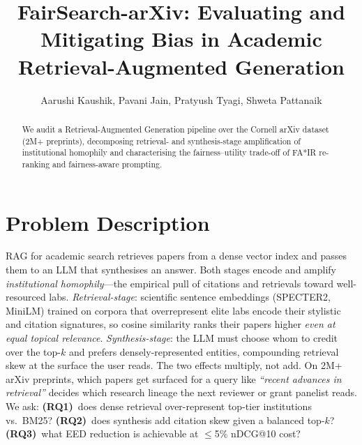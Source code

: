 \documentclass[sigconf]{acmart}
\begin{document}
\title[FairSearch-arXiv]{FairSearch-arXiv: Evaluating and Mitigating Bias in Academic Retrieval-Augmented Generation}

\author{Aarushi Kaushik, Pavani Jain, Pratyush Tyagi, Shweta Pattanaik}

\renewcommand{\shortauthors}{Kaushik, Jain, Tyagi, Pattanaik}

\begin{abstract}
We audit a Retrieval-Augmented Generation pipeline over the Cornell arXiv dataset (2M+ preprints), decomposing retrieval- and synthesis-stage amplification of institutional homophily and characterising the fairness--utility trade-off of FA*IR re-ranking and fairness-aware prompting.
\end{abstract}

\maketitle

\linenumbers

\thispagestyle{customfooter}
\pagestyle{customfooter}

\section{Problem Description}
RAG for academic search retrieves papers from a dense vector index and passes them to an LLM that synthesises an answer. Both stages encode and amplify \emph{institutional homophily}---the empirical pull of citations and retrievals toward well-resourced labs. \emph{Retrieval-stage}: scientific sentence embeddings (SPECTER2, MiniLM) trained on corpora that overrepresent elite labs encode their stylistic and citation signatures, so cosine similarity ranks their papers higher \emph{even at equal topical relevance}. \emph{Synthesis-stage}: the LLM must choose whom to credit over the top-$k$ and prefers densely-represented entities, compounding retrieval skew at the surface the user reads. The two effects multiply, not add. On 2M+ arXiv preprints, which papers get surfaced for a query like \emph{``recent advances in retrieval''} decides which research lineage the next reviewer or grant panelist reads. We ask: \textbf{(RQ1)}~does dense retrieval over-represent top-tier institutions vs.\ BM25? \textbf{(RQ2)}~does synthesis add citation skew given a balanced top-$k$? \textbf{(RQ3)}~what EED reduction is achievable at $\leq$5\% nDCG@10 cost?
\end{document}
